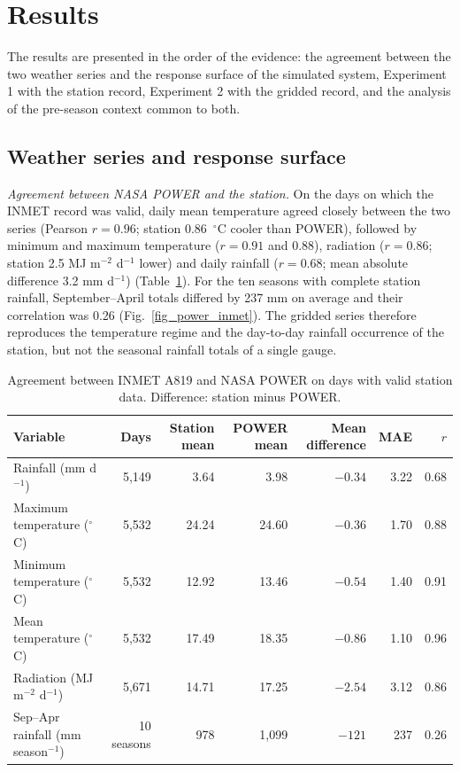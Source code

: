 \documentclass[times,final,authoryear]{elsarticle}
\begin{document}
\section{Results}
\label{resultados}

The results are presented in the order of the evidence: the agreement between the two weather series and the response surface of the simulated system, Experiment 1 with the station record, Experiment 2 with the gridded record, and the analysis of the pre-season context common to both.

\subsection{Weather series and response surface}
\label{subres_landscape}

\emph{Agreement between NASA POWER and the station.} On the days on which the INMET record was valid, daily mean temperature agreed closely between the two series (Pearson $r = 0.96$; station 0.86~$^{\circ}$C cooler than POWER), followed by minimum and maximum temperature ($r = 0.91$ and 0.88), radiation ($r = 0.86$; station 2.5 MJ m$^{-2}$ d$^{-1}$ lower) and daily rainfall ($r = 0.68$; mean absolute difference 3.2 mm d$^{-1}$) (Table~\ref{tab_power_agreement}). For the ten seasons with complete station rainfall, September--April totals differed by 237 mm on average and their correlation was 0.26 (Fig.~\ref{fig_power_inmet}). The gridded series therefore reproduces the temperature regime and the day-to-day rainfall occurrence of the station, but not the seasonal rainfall totals of a single gauge.

\begin{table}[!h]
\centering
\scriptsize
\caption{Agreement between INMET A819 and NASA POWER on days with valid station data. Difference: station minus POWER.}
\label{tab_power_agreement}
\begin{tabular}{lrrrrrr}
\hline
Variable & Days & Station mean & POWER mean & Mean difference & MAE & $r$ \\
\hline
Rainfall (mm d$^{-1}$) & 5,149 & 3.64 & 3.98 & $-0.34$ & 3.22 & 0.68 \\
Maximum temperature ($^{\circ}$C) & 5,532 & 24.24 & 24.60 & $-0.36$ & 1.70 & 0.88 \\
Minimum temperature ($^{\circ}$C) & 5,532 & 12.92 & 13.46 & $-0.54$ & 1.40 & 0.91 \\
Mean temperature ($^{\circ}$C) & 5,532 & 17.49 & 18.35 & $-0.86$ & 1.10 & 0.96 \\
Radiation (MJ m$^{-2}$ d$^{-1}$) & 5,671 & 14.71 & 17.25 & $-2.54$ & 3.12 & 0.86 \\
Sep--Apr rainfall (mm season$^{-1}$) & 10 seasons & 978 & 1,099 & $-121$ & 237 & 0.26 \\
\hline
\end{tabular}
\end{table}
\end{document}
